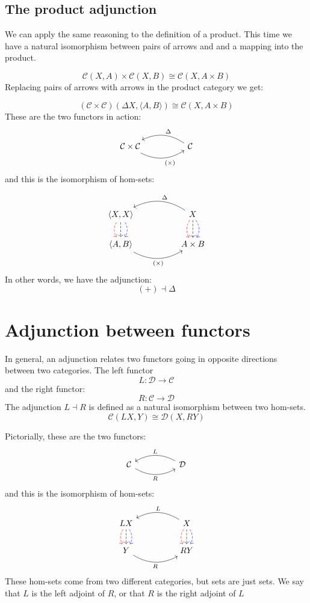\documentclass[DaoFP]{subfiles}
\begin{document}
\subsection{The product adjunction}

We can apply the same reasoning to the definition of a product. This time we have a natural isomorphism between pairs of arrows and and a mapping into the product.

\[  \mathcal{C} (X, A) \times \mathcal{C}(X, B) \cong  \mathcal{C} (X, A \times B)  \]
Replacing pairs of arrows with arrows in the product category we get:

\[  (\mathcal{C} \times \mathcal{C})( \Delta X,  \langle A, B \rangle ) \cong  \mathcal{C} (X, A \times B)  \]
These are the two functors in action:
\[
 \begin{tikzcd}
  \mathcal{C} \times \mathcal{C}
  \arrow[rr, bend right, "(\times)"']
  &&
  \mathcal{C}
  \arrow[ll, bend right, "\Delta"']
  \end{tikzcd}
\]
and this is the isomorphism of hom-sets:

\[
 \begin{tikzcd}
 \langle X, X \rangle
\arrow[d, bend right, red, dashed]
\arrow[d, dashed]
\arrow[d, bend left, blue, dashed]
  &&
  X
\arrow[d, bend right, red, dashed]
\arrow[d, dashed]
\arrow[d, bend left, blue, dashed]
 \arrow[ll, bend right, "\Delta"']
 \\
 \langle A , B \rangle
   \arrow[rr, bend right, "(\times)"']
 &&
 A \times B
  \end{tikzcd}
\]
In other words, we have the adjunction:
\[ (+) \dashv \Delta \]


\section{Adjunction between functors}

In general, an adjunction relates two functors going in opposite directions between two categories. The left functor 
\[ L \colon \mathcal{D} \to \mathcal{C}\]
and the right functor:
\[ R \colon \mathcal{C} \to  \mathcal{D} \]
The adjunction $L \dashv R$ is defined as a natural isomorphism between two hom-sets.
\[  \mathcal{C} (L X, Y) \cong \mathcal{D}( X , R Y)\]

Pictorially, these are the two functors:
\[
 \begin{tikzcd}
  \mathcal{C}
  \arrow[rr, bend right, "R"']
  &&
  \mathcal{D}
  \arrow[ll, bend right, "L"']
  \end{tikzcd}
\]
and this is the isomorphism of hom-sets:
\[
 \begin{tikzcd}
L X
\arrow[d, bend right, red, dashed]
\arrow[d, dashed]
\arrow[d, bend left, blue, dashed]
  &&
  X
\arrow[d, bend right, red, dashed]
\arrow[d, dashed]
\arrow[d, bend left, blue, dashed]
 \arrow[ll, bend right, "L"']
 \\
Y
   \arrow[rr, bend right, "R"']
 &&
 R Y
  \end{tikzcd}
\]
 These hom-sets come from two different categories, but sets are just sets. We say that $L$ is the left adjoint of $R$, or that $R$ is the right adjoint of $L$
\end{document}
